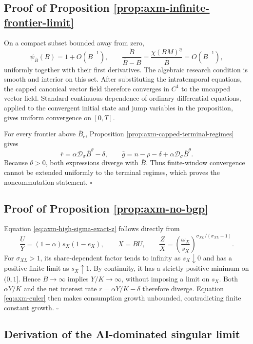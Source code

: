 \subsection{Proof of Proposition \ref{prop:axm-infinite-frontier-limit}}

On a compact subset bounded away from zero,
\[
 \psi_{\overline B}(B)=1+O(\overline B^{-1}),
 \qquad
 \frac{\dot B}{\overline B-B}
 =\frac{\chi(BM)^\eta}{\overline B}=O(\overline B^{-1}),
\]
uniformly together with their first derivatives. The algebraic research
condition is smooth and interior on this set. After substituting the
intratemporal equations, the capped canonical vector field therefore converges
in \(C^1\) to the uncapped vector field. Standard continuous dependence of
ordinary differential equations, applied to the convergent initial state and
jump variables in the proposition, gives uniform convergence on \([0,T]\).

For every frontier above \(\overline B_c\), Proposition
\ref{prop:axm-capped-terminal-regimes} gives
\[
 \bar r=\alpha\mathcal D_\sigma\overline B^\theta-\delta,
 \qquad
 \bar g=n-\rho-\delta
 +\alpha\mathcal D_\sigma\overline B^\theta.
\]
Because \(\theta>0\), both expressions diverge with \(\overline B\). Thus
finite-window convergence cannot be extended uniformly to the terminal regimes,
which proves the noncommutation statement. \(\square\)

\subsection{Proof of Proposition \ref{prop:axm-no-bgp}}

Equation \eqref{eq:axm-high-sigma-exact-z} follows directly from
\[
 \frac{U}{Y}=(1-\alpha)s_X(1-e_X),\qquad X=BU,
 \qquad
 \frac{Z}{X}=\left(\frac{\omega_X}{s_X}\right)^{
 \sigma_{XL}/(\sigma_{XL}-1)}.
\]
For \(\sigma_{XL}>1\), its share-dependent factor tends to infinity as
\(s_X\downarrow0\) and has a positive finite limit as \(s_X\uparrow1\). By
continuity, it has a strictly positive minimum on \((0,1]\). Hence
\(B\to\infty\) implies \(Y/K\to\infty\), without imposing a limit on
\(s_X\). Both \(\alpha Y/K\) and the net interest rate
\(r=\alpha Y/K-\delta\) therefore diverge. Equation \eqref{eq:axm-euler} then
makes consumption growth unbounded, contradicting finite constant growth.
\(\square\)

\subsection{Derivation of the AI-dominated singular limit}

